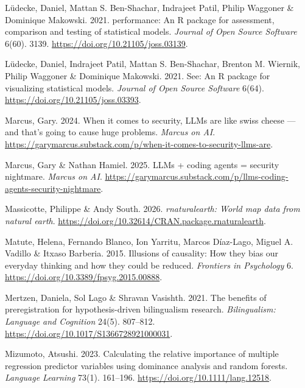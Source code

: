 \documentclass[
  letterpaper,
  DIV=11,
  numbers=noendperiod]{scrreprt}
\newlength{\cslhangindent}
\newenvironment{CSLReferences}[2] %
 {\begin{list}{}{%
  \setlength{\itemindent}{0pt}
  \setlength{\leftmargin}{0pt}
  \setlength{\parsep}{0pt}
  \ifodd #1
   \setlength{\leftmargin}{\cslhangindent}
   \setlength{\itemindent}{-1\cslhangindent}
  \fi
  \setlength{\itemsep}{#2\baselineskip}}}
 {\end{list}}
\begin{document}
\begin{CSLReferences}{1}{0}
Lüdecke, Daniel, Mattan S. Ben-Shachar, Indrajeet Patil, Philip Waggoner
\& Dominique Makowski. 2021. {performance}: An {R} package for
assessment, comparison and testing of statistical models. \emph{Journal
of Open Source Software} 6(60). 3139.
\url{https://doi.org/10.21105/joss.03139}.

Lüdecke, Daniel, Indrajeet Patil, Mattan S. Ben-Shachar, Brenton M.
Wiernik, Philip Waggoner \& Dominique Makowski. 2021. See: An {R}
package for visualizing statistical models. \emph{Journal of Open Source
Software} 6(64). \url{https://doi.org/10.21105/joss.03393}.

Marcus, Gary. 2024. When it comes to security, LLMs are like swiss
cheese --- and that's going to cause huge problems. \emph{Marcus on AI}.
\url{https://garymarcus.substack.com/p/when-it-comes-to-security-llms-are}.

Marcus, Gary \& Nathan Hamiel. 2025. LLMs + coding agents = security
nightmare. \emph{Marcus on AI}.
\url{https://garymarcus.substack.com/p/llms-coding-agents-security-nightmare}.

Massicotte, Philippe \& Andy South. 2026. \emph{{rnaturalearth}: World
map data from natural earth}.
\url{https://doi.org/10.32614/CRAN.package.rnaturalearth}.

Matute, Helena, Fernando Blanco, Ion Yarritu, Marcos Díaz-Lago, Miguel
A. Vadillo \& Itxaso Barberia. 2015. Illusions of causality: How they
bias our everyday thinking and how they could be reduced.
\emph{Frontiers in Psychology} 6.
\url{https://doi.org/10.3389/fpsyg.2015.00888}.

Mertzen, Daniela, Sol Lago \& Shravan Vasishth. 2021. The benefits of
preregistration for hypothesis-driven bilingualism research.
\emph{Bilingualism: Language and Cognition} 24(5). 807--812.
\url{https://doi.org/10.1017/S1366728921000031}.

Mizumoto, Atsushi. 2023. Calculating the relative importance of multiple
regression predictor variables using dominance analysis and random
forests. \emph{Language Learning} 73(1). 161--196.
\url{https://doi.org/10.1111/lang.12518}.


\end{CSLReferences}
\end{document}
